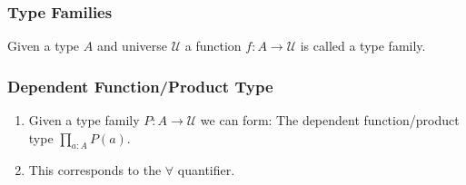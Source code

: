 \documentclass[14pt,compress]{beamer}
\newcommand{\U}{\mathcal{U}}
\begin{document}
\begin{frame}\label{frame : type families}
\frametitle{Type Families}
Given a type $A$ and universe $\U$ a function \textcolor{beamer@mathtext}{$f : A \to \U$} is called a
\textcolor{beamer@mathtext}{type family}.

\end{frame}

\begin{frame}\label{frame : dependent function type}
\frametitle{Dependent Function/Product Type}

\begin{enumerate}
\item Given a type family \textcolor{beamer@mathtext}{$P : A \to \U $} we can form:
The \textcolor{beamer@deepblue}{dependent function/product type}
\textcolor{beamer@mathtext}{$\prod_{a : A} P(a)$}.

\item \pause
This corresponds to the \textcolor{beamer@mathtext}{$\forall$} quantifier.

\end{enumerate}

\end{frame}
\end{document}
